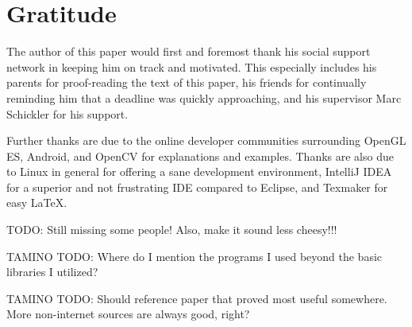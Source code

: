 \section*{Gratitude}

The author of this paper would first and foremost thank his social support network in keeping him on track and motivated.
This especially includes his parents for proof-reading the text of this paper, his friends for continually reminding him that a deadline was quickly approaching, and his supervisor Marc Schickler for his support.

Further thanks are due to the online developer communities surrounding OpenGL ES, Android, and OpenCV for explanations and examples.
Thanks are also due to Linux in general for offering a sane development environment, IntelliJ IDEA for a superior and not frustrating IDE compared to Eclipse, and Texmaker for easy \LaTeX .

TODO: Still missing some people! Also, make it sound less cheesy!!!

TAMINO TODO: Where do I mention the programs I used beyond the basic libraries I utilized?

TAMINO TODO: Should reference paper that proved most useful somewhere. More non-internet sources are always good, right?
